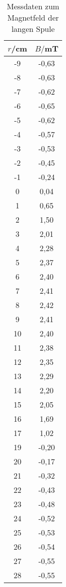 \begin{table}
  \centering
    \caption{Messdaten zum Magnetfeld der langen Spule}
    \label{tab:lange_spule}
    \begin{tabular}{c c}
      \toprule
      $r$/cm & $B/$mT \\
      \midrule
      -9	&  -0,63\\
      -8	&  -0,63\\
      -7	&  -0,62\\
      -6	&  -0,65\\
      -5	&  -0,62\\
      -4	&  -0,57\\
      -3	&  -0,53\\
      -2	&  -0,45\\
      -1	&  -0,24\\
      0	  &  0,04\\
      1	  &  0,65\\
      2	  &  1,50\\
      3	  &  2,01\\
      4	  &  2,28\\
      5	  &  2,37\\
      6   &  2,40\\
      7	  &  2,41\\
      8	  &  2,42\\
      9	  &  2,41\\
      10	&  2,40\\
      11	&  2,38\\
      12	&  2,35\\
      13	&  2,29\\
      14	&  2,20\\
      15	&  2,05\\
      16	&  1,69\\
      17	&  1,02\\
      19	&  -0,20\\
      20	&  -0,17\\
      21	&  -0,32\\
      22	&  -0,43\\
      23	&  -0,48\\
      24	&  -0,52\\
      25	&  -0,53\\
      26	&  -0,54\\
      27	&  -0,55\\
      28	&  -0,55\\
      \bottomrule
    \end{tabular}
\end{table}
